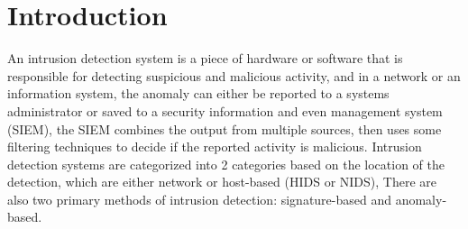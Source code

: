 \section{Introduction}
An intrusion detection system is a piece of hardware or software that is responsible for detecting suspicious and malicious activity, and in a network or an information system, the anomaly can either be reported to a systems administrator or saved to a security information and even management system (SIEM), the SIEM combines the output from multiple sources, then uses some filtering techniques to decide if the reported activity is malicious. \cite{1}Intrusion detection systems are categorized into 2 categories based on the location of the detection, which are either network or host-based (HIDS or NIDS), There are also two primary methods of intrusion detection: signature-based and anomaly-based. \cite{2}
